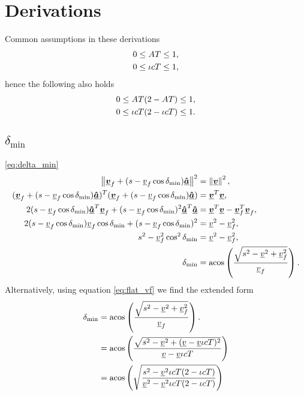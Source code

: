 \section{Derivations}
\label{app:derivations}
Common assumptions in these derivations
\begin{align}
\label{eq:assump_accel_1}
0 \le \mathmakebox[\widthof{$\iota c$}]{A}T \le 1,\\
\label{eq:assump_friction_1}
0 \le \iota cT \le 1,
\end{align}
hence the following also holds
\begin{align}
\label{eq:assump_accel_2}
0 \le \mathmakebox[\widthof{$\iota c$}]{A}T (2 - \mathmakebox[\widthof{$\iota c$}]{A} T) \le 1,\\
\label{eq:assump_friction_2}
0 \le \iota cT(2 - \iota cT) \le 1.
\end{align}


\subsection{\texorpdfstring{$\delta_{\min}$}{delta\_min}}
\eqref{eq:delta_min}
\begin{align*}
\norm{\vec{\flat{v}}_f + (s - \flat{v}_f \cos\delta_{\min})\uvec{\flat{a}}}^2 &= \norm{\vec{\flat{v}}}^2,\\
(\vec{\flat{v}}_f + (s - \flat{v}_f \cos\delta_{\min})\uvec{\flat{a}})^T (\vec{\flat{v}}_f + (s - \flat{v}_f \cos\delta_{\min})\uvec{\flat{a}}) &= \vec{\flat{v}}^T \vec{\flat{v}},\\
2(s - \flat{v}_f \cos\delta_{\min}) \uvec{\flat{a}}^T \vec{\flat{v}}_f + (s - \flat{v}_f \cos\delta_{\min})^2 \uvec{\flat{a}}^T \uvec{\flat{a}} &= \vec{\flat{v}}^T \vec{\flat{v}} - \vec{\flat{v}}_f^T \vec{\flat{v}}_f,\\
2(s - \flat{v}_f \cos\delta_{\min}) \flat{v}_f \cos\delta_{\min} + (s - \flat{v}_f \cos\delta_{\min})^2 &= \flat{v}^2 - \flat{v}_f^2,\\
s^2 - \flat{v}_f^2 \cos^2\delta_{\min} &= \flat{v}^2 - \flat{v}_f^2,\\
\delta_{\min} &= \acos\left(\frac{\sqrt{s^2 - \flat{v}^2 + \flat{v}_f^2}}{\flat{v}_f} \right).
\end{align*}
Alternatively, using equation \eqref{eq:flat_vf} we find the extended form
\begin{align*}
\delta_{\min} &= \acos\left(\frac{\sqrt{s^2 - \flat{v}^2 + \flat{v}_f^2}}{\flat{v}_f} \right).\\
&= \acos\left(\frac{\sqrt{s^2 - \flat{v}^2 + (\flat{v} - \flat{v}\iota cT)^2}}{\flat{v} - \flat{v}\iota cT} \right)\\
&= \acos\left(\sqrt{\frac{s^2 - \flat{v}^2\iota cT(2 - \iota cT)}{\flat{v}^2 - \flat{v}^2\iota cT(2 - \iota cT)}} \right)\\
\end{align*}

